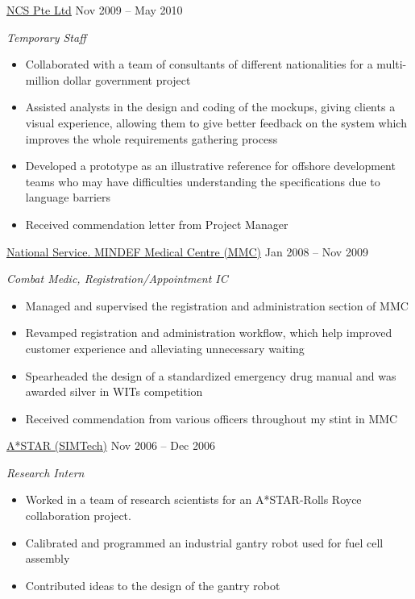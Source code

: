 \documentclass{friggeri-cv} %
\begin{document}
\entry
{\href{http://www.ncs.com.sg/}{NCS Pte Ltd}}
{Nov 2009 -- May 2010}
{\emph{Temporary Staff}
\begin {itemize}
\item Collaborated with a team of consultants of different nationalities for a multi-million dollar government project
\item Assisted analysts in the design and coding of the mockups, giving clients a visual experience, allowing them to give better feedback on the system which improves the whole requirements gathering process
\item Developed a prototype as an illustrative reference for offshore development teams who may have difficulties understanding the specifications due to language barriers
\item Received commendation letter from Project Manager
\end{itemize}
}
\entry
{\href{http://www.mindef.gov.sg/imindef/home.html}{National Service. MINDEF Medical Centre (MMC)}}
{Jan 2008 -- Nov 2009}
{\emph{Combat Medic, Registration/Appointment IC}
\begin {itemize}
\item Managed and supervised the registration and administration section of MMC
\item Revamped registration and administration workflow, which help improved customer experience and alleviating unnecessary waiting
\item Spearheaded the design of a standardized emergency drug manual and was awarded silver in WITs competition
\item Received commendation from various officers throughout my stint in MMC
\end{itemize}
}
\entry
{\href{http://www.simtech.a-star.edu.sg/}{A*STAR (SIMTech)}}
{Nov 2006 -- Dec 2006}
{\emph{Research Intern}
\begin {itemize}
\item Worked in a team of research scientists for an A*STAR-Rolls Royce collaboration project.
\item Calibrated and programmed an industrial gantry robot used for fuel cell assembly
\item Contributed ideas to the design of the gantry robot
\end{itemize}
}
\vspace{-2.2\parsep}
\end{document}
